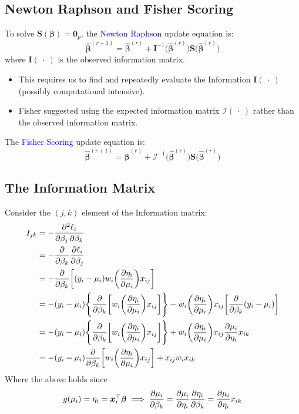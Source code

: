 \documentclass[oneside]{book}\usepackage[]{graphicx}\usepackage[svgnames]{xcolor}
\providecommand{\Vector}[1]{\bm{#1}}%
\providecommand{\Matrix}[1]{\bm{#1}}
\begin{document}
\subsection*{Newton Raphson and Fisher Scoring}
To solve $ \Vector{S}(\Vector{\beta})=\Vector{0}_p $, the \textcolor{Blue}{Newton Raphson} update equation is:
\[ \hat{\Vector{\beta}}^{(r+1)}=\hat{\Vector{\beta}}^{(r)}+\Matrix{I}^{-1}\bigl(\hat{\Vector{\beta}}^{(r)}\bigr)\Vector{S}\bigl(\hat{\Vector{\beta}}^{(r)}\bigr) \]
where $ \Matrix{I}(\:\cdot\:) $ is the observed information matrix.
\begin{itemize}
    \item This requires us to find and repeatedly evaluate the Information $ \Matrix{I}(\:\cdot\:) $ (possibly computational intensive).
    \item Fisher suggested using the expected information matrix $ \mathcal{I}(\:\cdot\:) $ rather than the observed information matrix.
\end{itemize}
The \textcolor{Blue}{Fisher Scoring} update equation is:
\[ \hat{\Vector{\beta}}^{(r+1)}=\hat{\Vector{\beta}}^{(r)}+\mathcal{I}^{-1}\bigl(\hat{\Vector{\beta}}^{(r)}\bigr)\Vector{S}\bigl(\hat{\Vector{\beta}}^{(r)}\bigr) \]
\subsection*{The Information Matrix}
Consider the $(j, k)$ element of the Information matrix:
\begin{align*}
    I_{jk} & =-\pdv{\ell_i}{\beta_j,\beta_k}                                                                                                                                                           \\
           & =-\pdv*{\pdv{\ell_i}{\beta_j}}{\beta_k}                                                                                                                                                   \\
           & =-\pdv*{\biggl[(y_i-\mu_i)w_i\biggl(\pdv{\eta_i}{\mu_i}\biggr)x_{ij}\biggr]}{\beta_k}                                                                                                     \\
           & =-(y_i-\mu_i)\Biggl\{\pdv*{\biggl[w_i\biggl(\pdv{\eta_i}{\mu_i}\biggr)x_{ij}\biggr]}{\beta_k}\Biggr\}-w_i\biggl(\pdv{\eta_i}{\mu_i}\biggr)x_{ij}\biggl[\pdv*{(y_i-\mu_i)}{\beta_k}\biggr] \\
           & =-(y_i-\mu_i)\Biggl\{\pdv*{\biggl[w_i\biggl(\pdv{\eta_i}{\mu_i}\biggr)x_{ij}\biggr]}{\beta_k}\Biggr\}+w_i\biggl(\pdv{\eta_i}{\mu_i}\biggr)x_{ij}\pdv{\mu_i}{\eta_i}x_{ik}                 \\
           & =-(y_i-\mu_i)\pdv*{\biggl[w_i\biggl(\pdv{\eta_i}{\mu_i}\biggr)x_{ij}\biggr]}{\beta_k}+x_{ij}w_i x_{ik}
\end{align*}
Where the above holds since
\[ g(\mu_i)=\eta_i=\Vector{x}_i^\top \Vector{\beta}\implies \pdv{\mu_i}{\beta_k}=\pdv{\mu_i}{\eta_i}\pdv{\eta_i}{\beta_k}=\pdv{\mu_i}{\eta_i}x_{ik} \]
\end{document}
